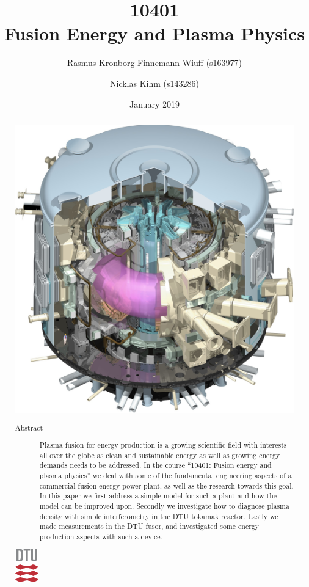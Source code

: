 \documentclass[aps, prb, a4paper, english, 12pt, onecolumn, longbibliography, amsmath, amssymb, colorinlistoftodos, floatfix]{revtex4-1}
\begin{document}
\begin{abstract}
	\vspace{5mm}
	\centering
	\includegraphics[width=.5\textwidth]{Figures/ITERmachine.jpg}
	\begin{description}
		\item[Abstract] Plasma fusion for energy production is a growing scientific field with interests all over the globe as clean and sustainable energy as well as growing energy demands needs to be addressed. In the course ``10401: Fusion energy and plasma physics'' we deal with some of the fundamental engineering aspects of a commercial fusion energy power plant, as well as the research towards this goal. In this paper we first address a simple model for such a plant and how the model can be improved upon. Secondly we investigate how to diagnose plasma density with simple interferometry in the DTU tokamak reactor. Lastly we made measurements in the DTU fusor, and investigated some energy production aspects with such a device. \vspace{3\baselineskip}
	\end{description}
	\includegraphics[width=1cm]{Figures/DTU3CMYK.eps}
\end{abstract}

\title{10401\\Fusion Energy and Plasma Physics}
\date{January  2019}
\author{Rasmus Kronborg Finnemann Wiuff (s163977)}
\author{Nicklas Kihm (s143286)}
\maketitle
\end{document}
